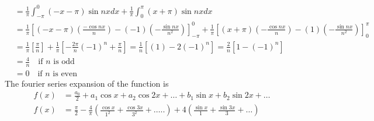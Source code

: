 \begin{enumerate}[label=\color{ocre}\textbf{\arabic*.}]
\begin{answer}
\begin{align*}
		&=\frac{1}{\pi} \int_{-\pi}^{0}(-x-\pi) \sin n x d x+\frac{1}{\pi} \int_{0}^{\pi}(x+\pi) \sin n x d x \\
		&=\frac{1}{\pi}\left[(-x-\pi)\left(\frac{-\cos n x}{n}\right)-(-1)\left(-\frac{\sin n x}{n^{2}}\right)\right]_{-\pi}^{0}+\frac{1}{\pi}\left[(x+\pi)\left(-\frac{\cos n x}{n}\right)-(1)\left(-\frac{\sin n x}{n^{2}}\right)\right]_{0}^{\pi} \\
		&=\frac{1}{\pi}\left[\frac{\pi}{n}\right]+\frac{1}{\pi}\left[-\frac{2 \pi}{n}(-1)^{n}+\frac{\pi}{n}\right]=\frac{1}{n}\left[(1)-2(-1)^{n}\right]=\frac{2}{n}\left[1-(-1)^{n}\right]\\
		&=\frac{4}{n}\quad \text{if $n$ is odd}\\
		&=0 \quad \text{if $n$ is even}
	\end{align*}
	The fourier series expansion of the function is
	\begin{align*}
	f(x)&=\frac{a_{0}}{2}+a_{1} \cos x+a_{2} \cos 2 x+\ldots+b_{1} \sin x+b_{2} \sin 2 x+\ldots \\
	f(x)&=\frac{\pi}{2}-\frac{4}{\pi}\left(\frac{\cos x}{1^{2}}+\frac{\cos 3 x}{3^{2}}+\ldots . .\right)+4\left(\frac{\sin x}{1}+\frac{\sin 3 x}{3}+\ldots\right)
	\end{align*}
	

\end{answer}
\end{enumerate}
